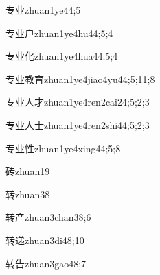 \begin{verbete}{专业}{zhuan1ye4}{4;5}
\end{verbete}

\begin{verbete}{专业户}{zhuan1ye4hu4}{4;5;4}
\end{verbete}

\begin{verbete}{专业化}{zhuan1ye4hua4}{4;5;4}
\end{verbete}

\begin{verbete}{专业教育}{zhuan1ye4jiao4yu4}{4;5;11;8}
\end{verbete}

\begin{verbete}{专业人才}{zhuan1ye4ren2cai2}{4;5;2;3}
\end{verbete}

\begin{verbete}{专业人士}{zhuan1ye4ren2shi4}{4;5;2;3}
\end{verbete}

\begin{verbete}{专业性}{zhuan1ye4xing4}{4;5;8}
\end{verbete}

\begin{verbete}{砖}{zhuan1}{9}
\end{verbete}

\begin{verbete}{转}{zhuan3}{8}
\end{verbete}

\begin{verbete}{转产}{zhuan3chan3}{8;6}
\end{verbete}

\begin{verbete}{转递}{zhuan3di4}{8;10}
\end{verbete}

\begin{verbete}{转告}{zhuan3gao4}{8;7}
\end{verbete}

